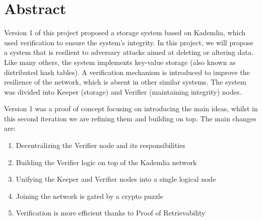 \chapter{Abstract}
\label{chap:abstract}

Version 1 of this project proposed a storage system based on Kademlia, which used verification to ensure the system's integrity.
In this project, we will propose a system that is resilient to adversary attacks aimed at deleting or altering data.
Like many others, the system implements key-value storage (also known as distributed hash tables).
A verification mechanism is introduced to improve the resilience of the network, which is absent in other similar systems.
The system was divided into Keeper (storage) and Verifier (maintaining integrity) nodes.

Version 1 was a proof of concept focusing on introducing the main ideas, whilst in this second iteration we are refining them and building on top.
The main changes are:

\begin{enumerate}
    \item Decentralizing the Verifier node and its responsibilities
    \item Building the Verifier logic on top of the Kademlia network
    \item Unifying the Keeper and Verifier nodes into a single logical node
    \item Joining the network is gated by a crypto puzzle
    \item Verification is more efficient thanks to Proof of Retrievability
\end{enumerate}
